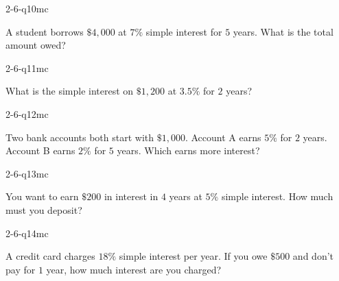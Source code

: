 \begin{practiceQuestion}{2-6-q10}{mc}
\begin{questionText}
A student borrows $\$4{,}000$ at $7\%$ simple interest for $5$ years. What is the total amount owed?
\end{questionText}
\end{practiceQuestion}

\begin{practiceQuestion}{2-6-q11}{mc}
\begin{questionText}
What is the simple interest on $\$1{,}200$ at $3.5\%$ for $2$ years?
\end{questionText}
\end{practiceQuestion}

\begin{practiceQuestion}{2-6-q12}{mc}
\begin{questionText}
Two bank accounts both start with $\$1{,}000$. Account A earns $5\%$ for $2$ years. Account B earns $2\%$ for $5$ years. Which earns more interest?
\end{questionText}
\end{practiceQuestion}

\begin{practiceQuestion}{2-6-q13}{mc}
\begin{questionText}
You want to earn $\$200$ in interest in $4$ years at $5\%$ simple interest. How much must you deposit?
\end{questionText}
\end{practiceQuestion}

\begin{practiceQuestion}{2-6-q14}{mc}
\begin{questionText}
A credit card charges $18\%$ simple interest per year. If you owe $\$500$ and don't pay for $1$ year, how much interest are you charged?
\end{questionText}
\end{practiceQuestion}

